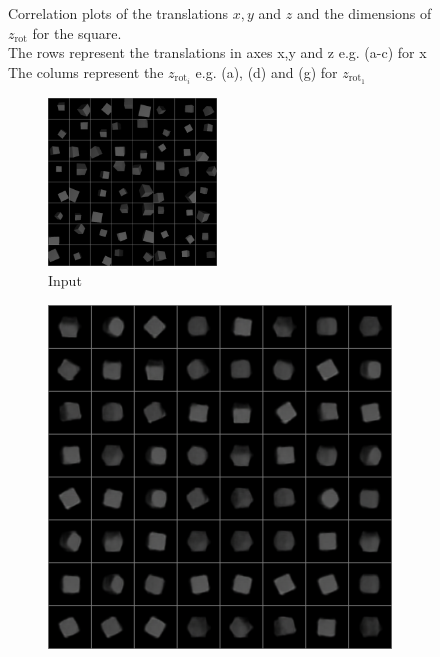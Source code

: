 \documentclass[10pt,a4paper]{article}
\newcommand{\rot}{\ensuremath{\text{rot}\xspace}}
\begin{document}
\begin{figure}[!ht]
\begin{subfigure}{0.3\textwidth}
	\caption{}
	\label{fig_zz2}
\end{subfigure}
\caption{Correlation plots of the translations $x,y$ and $z$ and the dimensions of $z_{\rot}$ for the square.\\
The rows represent the translations in axes x,y and z e.g. (a-c) for x\\
The colums represent the $z_{\rot_i}$ e.g. (a), (d) and (g) for $z_{\rot_1}$} \label{Square_corr_trans}
\end{figure}


\begin{figure}[!ht]
\centering
\begin{subfigure}{\textwidth}
	\centering
	\includegraphics[width=0.49\textwidth] {cube_input.png}
	\caption{Input}
	\label{cube_in}
\end{subfigure}
\begin{subfigure}{0.49\textwidth}
	\centering
	\includegraphics[width=\textwidth] {cube_output0.png}

\end{subfigure}
\end{figure}
\end{document}
